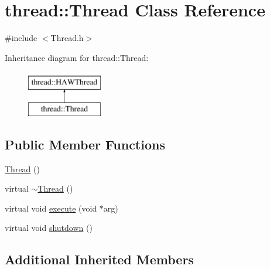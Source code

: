 \hypertarget{classthread_1_1_thread}{\section{thread\-:\-:Thread Class Reference}
\label{classthread_1_1_thread}
}


{\ttfamily \#include $<$Thread.\-h$>$}

Inheritance diagram for thread\-:\-:Thread\-:\begin{figure}[H]
\begin{center}
\leavevmode
\includegraphics[height=2.000000cm]{classthread_1_1_thread}
\end{center}
\end{figure}
\subsection*{Public Member Functions}
\begin{DoxyCompactItemize}
\item 
\hyperlink{classthread_1_1_thread_ade4761946b42cc3d1a32fc04f5405f48}{Thread} ()
\item 
virtual \hyperlink{classthread_1_1_thread_a5cc06f9b6a7fe494e0f64e4476117255}{$\sim$\-Thread} ()
\item 
virtual void \hyperlink{classthread_1_1_thread_a2444c1af4f269dacaead0ec8ee266123}{execute} (void $\ast$arg)
\item 
virtual void \hyperlink{classthread_1_1_thread_abda49d1f648def9611927897cbae668d}{shutdown} ()
\end{DoxyCompactItemize}
\subsection*{Additional Inherited Members}


